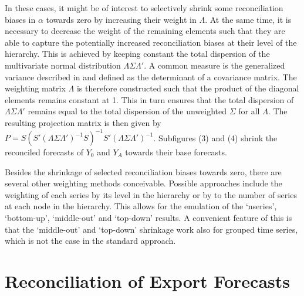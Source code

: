 \documentclass[a4paper,fleqn,11pt]{article}
\begin{document}
In these cases, it might be of interest to selectively shrink some reconciliation biases in $\alpha$ towards zero by increasing their weight in $\Lambda$. At the same time, it is necessary to decrease the weight of the remaining elements such that they are able to capture the potentially increased reconciliation biases at their level of the hierarchy. This is achieved by keeping constant the total dispersion of the  multivariate normal distribution $\Lambda\Sigma\Lambda'$. A common measure is the generalized variance described in \cite{Mustonen1997} and defined as the determinant of a covariance matrix. The weighting matrix $\Lambda$ is therefore constructed such that the product of the diagonal elements remains constant at 1. This in turn ensures that the total dispersion of $\Lambda\Sigma\Lambda'$ remains equal to the total dispersion of the unweighted $\Sigma$ for all $\Lambda$. The resulting projection matrix is then given by  $P= S(S'(\Lambda\Sigma\Lambda')^{-1}S)^{-1}S'(\Lambda\Sigma\Lambda')^{-1}$. Subfigures (3) and (4) shrink the reconciled forecasts of $Y_0$ and $Y_A$ towards their base forecasts.

Besides the shrinkage of selected reconciliation biases towards zero, there are several other weighting methods conceivable.  Possible approaches include the weighting of each series by its level in the hierarchy or by to the number of series at each node in the hierarchy. This allows for the emulation of the `nseries', `bottom-up', `middle-out' and `top-down' results. A convenient feature of this is that the `middle-out' and `top-down' shrinkage work also for grouped time series, which is not the case in the standard approach. \\

\clearpage


\section{Reconciliation of Export Forecasts}
\label{sec:appl}
\end{document}
